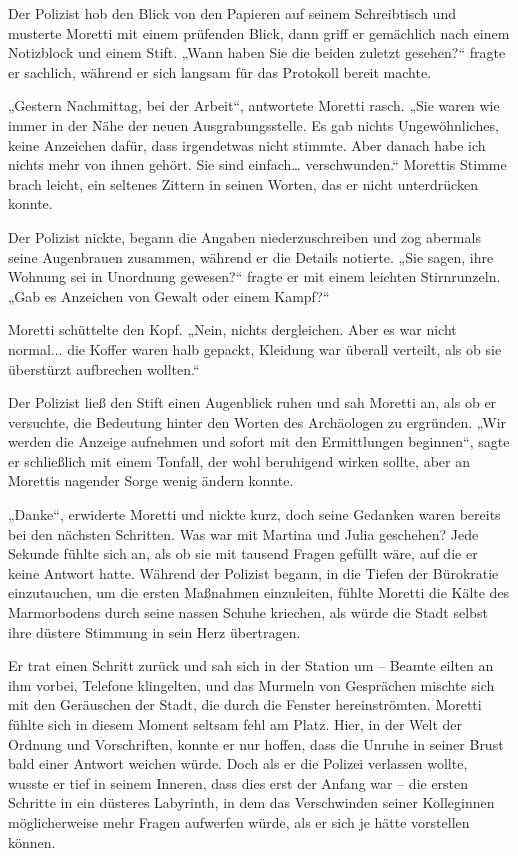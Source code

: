 \documentclass[
]{article}
\begin{document}
Der Polizist hob den Blick von den Papieren auf seinem Schreibtisch und
musterte Moretti mit einem prüfenden Blick, dann griff er gemächlich
nach einem Notizblock und einem Stift. „Wann haben Sie die beiden
zuletzt gesehen?{\kern0pt}`` fragte er sachlich, während er sich langsam
für das Protokoll bereit machte.

„Gestern Nachmittag, bei der Arbeit``, antwortete Moretti rasch. „Sie
waren wie immer in der Nähe der neuen Ausgrabungsstelle. Es gab nichts
Ungewöhnliches, keine Anzeichen dafür, dass irgendetwas nicht stimmte.
Aber danach habe ich nichts mehr von ihnen gehört. Sie sind
einfach\ldots{} verschwunden.`` Morettis Stimme brach leicht, ein
seltenes Zittern in seinen Worten, das er nicht unterdrücken konnte.

Der Polizist nickte, begann die Angaben niederzuschreiben und zog
abermals seine Augenbrauen zusammen, während er die Details notierte.
„Sie sagen, ihre Wohnung sei in Unordnung gewesen?{\kern0pt}`` fragte er
mit einem leichten Stirnrunzeln. „Gab es Anzeichen von Gewalt oder einem
Kampf?{\kern0pt}``

Moretti schüttelte den Kopf. „Nein, nichts dergleichen. Aber es war
nicht normal... die Koffer waren halb gepackt, Kleidung war überall
verteilt, als ob sie überstürzt aufbrechen wollten.``

Der Polizist ließ den Stift einen Augenblick ruhen und sah Moretti an,
als ob er versuchte, die Bedeutung hinter den Worten des Archäologen zu
ergründen. „Wir werden die Anzeige aufnehmen und sofort mit den
Ermittlungen beginnen``, sagte er schließlich mit einem Tonfall, der
wohl beruhigend wirken sollte, aber an Morettis nagender Sorge wenig
ändern konnte.

„Danke``, erwiderte Moretti und nickte kurz, doch seine Gedanken waren
bereits bei den nächsten Schritten. Was war mit Martina und Julia
geschehen? Jede Sekunde fühlte sich an, als ob sie mit tausend Fragen
gefüllt wäre, auf die er keine Antwort hatte. Während der Polizist
begann, in die Tiefen der Bürokratie einzutauchen, um die ersten
Maßnahmen einzuleiten, fühlte Moretti die Kälte des Marmorbodens durch
seine nassen Schuhe kriechen, als würde die Stadt selbst ihre düstere
Stimmung in sein Herz übertragen.

Er trat einen Schritt zurück und sah sich in der Station um -- Beamte
eilten an ihm vorbei, Telefone klingelten, und das Murmeln von
Gesprächen mischte sich mit den Geräuschen der Stadt, die durch die
Fenster hereinströmten. Moretti fühlte sich in diesem Moment seltsam
fehl am Platz. Hier, in der Welt der Ordnung und Vorschriften, konnte er
nur hoffen, dass die Unruhe in seiner Brust bald einer Antwort weichen
würde. Doch als er die Polizei verlassen wollte, wusste er tief in
seinem Inneren, dass dies erst der Anfang war -- die ersten Schritte in
ein düsteres Labyrinth, in dem das Verschwinden seiner Kolleginnen
möglicherweise mehr Fragen aufwerfen würde, als er sich je hätte
vorstellen können.
\end{document}
